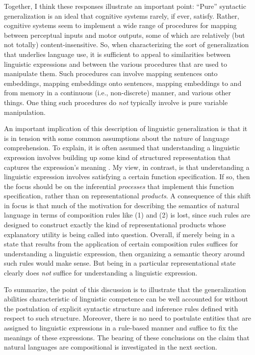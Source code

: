 Together, I think these responses illustrate an important point: ``Pure'' syntactic generalization \citep[][p. 151]{Eliasmith:2013} is an ideal that cognitive systems rarely, if ever, satisfy. Rather, cognitive systems seem to implement a wide range of procedures for mapping between perceptual inputs and motor outputs, some of which are relatively (but not totally) content-insensitive. So, when characterizing the sort of generalization that underlies language use, it is sufficient to appeal to similarities between linguistic expressions and between the various procedures that are used to manipulate them. Such procedures can involve mapping sentences onto embeddings, mapping embeddings onto sentences, mapping embeddings to and from memory in a continuous (i.e., non-discrete) manner, and various other things. One thing such procedures do \textit{not} typically involve is pure variable manipulation. 

An important implication of this description of linguistic generalization is that it is in tension with some common assumptions about the nature of language comprehension. To explain, it is often assumed that understanding a linguistic expression involves building up some kind of structured representation that captures the expression's meaning \citep[see e.g.,][]{SmolenskyLegendre:2006}. My view, in contrast, is that understanding a linguistic expression involves satisfying a certain function specification. If so, then the focus should be on the inferential \textit{processes} that implement this function specification, rather than on representational \textit{products}. A consequence of this shift in focus is that much of the motivation for describing the semantics of natural language in terms of composition rules like (1) and (2) is lost, since such rules are designed to construct exactly the kind of representational products whose explanatory utility is being called into question. Overall, if merely being in a state that results from the application of certain composition rules suffices for understanding a linguistic expression, then organizing a semantic theory around such rules would make sense. But being in a particular representational state clearly does \textit{not} suffice for understanding a linguistic expression.

To summarize, the point of this discussion is to illustrate that the generalization abilities characteristic of linguistic competence can be well accounted for without the postulation of explicit syntactic structure and inference rules defined with respect to such structure. Moreover, there is no need to postulate entities that are assigned to linguistic expressions in a rule-based manner and suffice to fix the meanings of these expressions. The bearing of these conclusions on the claim that natural languages are compositional is investigated in the next section.  

